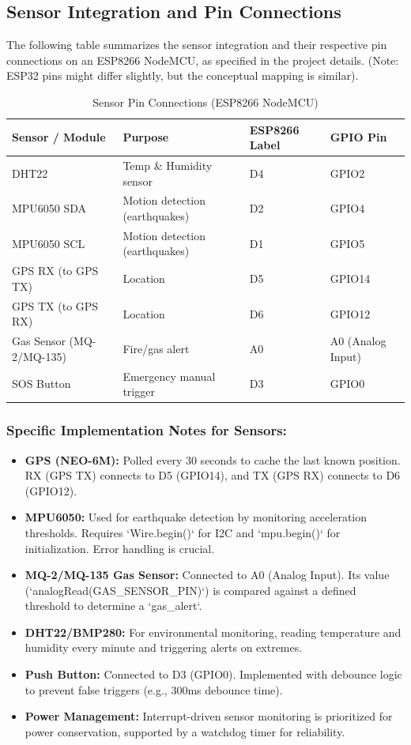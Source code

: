 \documentclass[12pt, a4paper]{article}
\begin{document}
\subsection{Sensor Integration and Pin Connections}
The following table summarizes the sensor integration and their respective pin connections on an ESP8266 NodeMCU, as specified in the project details. (Note: ESP32 pins might differ slightly, but the conceptual mapping is similar).

\begin{table}[H]
    \centering
    \caption{Sensor Pin Connections (ESP8266 NodeMCU)}
    \label{tab:sensor_pins}
    \begin{tabular}{llll}
        \toprule
        \textbf{Sensor / Module} & \textbf{Purpose} & \textbf{ESP8266 Label} & \textbf{GPIO Pin} \\
        \midrule
        DHT22 & Temp \& Humidity sensor & D4 & GPIO2 \\
        MPU6050 SDA & Motion detection (earthquakes) & D2 & GPIO4 \\
        MPU6050 SCL & Motion detection (earthquakes) & D1 & GPIO5 \\
        GPS RX (to GPS TX) & Location & D5 & GPIO14 \\
        GPS TX (to GPS RX) & Location & D6 & GPIO12 \\
        Gas Sensor (MQ-2/MQ-135) & Fire/gas alert & A0 & A0 (Analog Input) \\
        SOS Button & Emergency manual trigger & D3 & GPIO0 \\
        \bottomrule
    \end{tabular}
\end{table}

\subsubsection{Specific Implementation Notes for Sensors:}
\begin{itemize}
    \item \textbf{GPS (NEO-6M):} Polled every 30 seconds to cache the last known position. RX (GPS TX) connects to D5 (GPIO14), and TX (GPS RX) connects to D6 (GPIO12).
    \item \textbf{MPU6050:} Used for earthquake detection by monitoring acceleration thresholds. Requires `Wire.begin()` for I2C and `mpu.begin()` for initialization. Error handling is crucial.
    \item \textbf{MQ-2/MQ-135 Gas Sensor:} Connected to A0 (Analog Input). Its value (`analogRead(GAS\_SENSOR\_PIN)`) is compared against a defined threshold to determine a `gas\_alert`.
    \item \textbf{DHT22/BMP280:} For environmental monitoring, reading temperature and humidity every minute and triggering alerts on extremes.
    \item \textbf{Push Button:} Connected to D3 (GPIO0). Implemented with debounce logic to prevent false triggers (e.g., 300ms debounce time).
    \item \textbf{Power Management:} Interrupt-driven sensor monitoring is prioritized for power conservation, supported by a watchdog timer for reliability.
\end{itemize}
\end{document}
